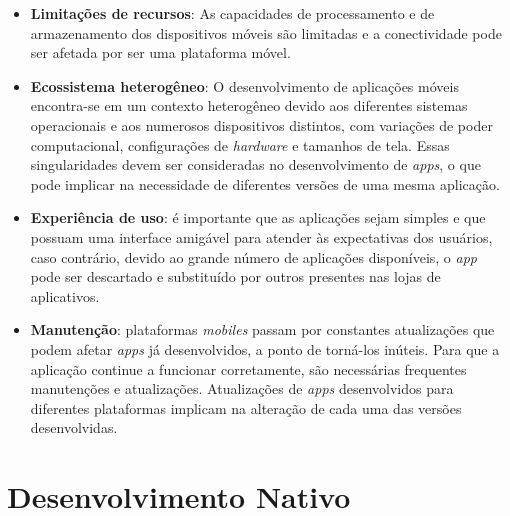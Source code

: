 \begin{itemize}
	
    \item \textbf{Limitações de recursos}: As capacidades de processamento e de armazenamento dos dispositivos móveis são limitadas e a conectividade pode ser afetada por ser uma plataforma móvel. 
    
    \item \textbf{Ecossistema heterogêneo}:   O desenvolvimento de aplicações móveis encontra-se em um contexto heterogêneo 
    devido aos diferentes sistemas operacionais e aos numerosos dispositivos distintos, com variações de poder computacional, configurações de \textit{hardware} e tamanhos de tela.
    Essas singularidades devem ser consideradas no desenvolvimento de \textit{apps}, o que  pode implicar na necessidade de diferentes versões de uma mesma aplicação.
    
    \item \textbf{Experiência de uso}: é importante que as aplicações sejam simples e que possuam uma interface amigável para atender às expectativas dos usuários, caso contrário, devido ao grande número de aplicações disponíveis, o \textit{app} pode ser descartado e substituído por outros presentes nas lojas de aplicativos.
    
    \item \textbf{Manutenção}: plataformas \textit{mobiles} passam por constantes atualizações que podem afetar \textit{apps} já desenvolvidos, a ponto de torná-los inúteis. Para que a aplicação continue a funcionar corretamente, são necessárias frequentes manutenções e atualizações.
    Atualizações de \textit{apps} desenvolvidos para diferentes plataformas implicam na alteração de cada uma das versões desenvolvidas.
    
\end{itemize}

\section{Desenvolvimento Nativo} \label{section:desenvolvimentonativo}

